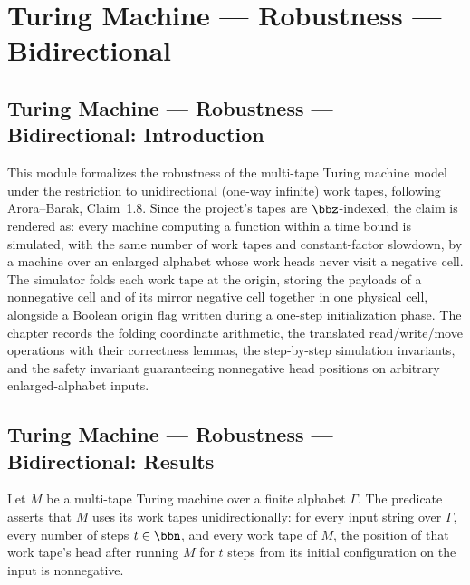 \section{Turing Machine --- Robustness --- Bidirectional}
\subsection*{Turing Machine --- Robustness --- Bidirectional: Introduction}

This module formalizes the robustness of the multi-tape Turing machine model under
the restriction to unidirectional (one-way infinite) work tapes, following
Arora--Barak, Claim~1.8.  Since the project's tapes are $\bbz$-indexed, the claim is
rendered as: every machine computing a function within a time bound is simulated,
with the same number of work tapes and constant-factor slowdown, by a machine over an
enlarged alphabet whose work heads never visit a negative cell.  The simulator folds
each work tape at the origin, storing the payloads of a nonnegative cell and of its
mirror negative cell together in one physical cell, alongside a Boolean origin flag
written during a one-step initialization phase.  The chapter records the folding
coordinate arithmetic, the translated read/write/move operations with their
correctness lemmas, the step-by-step simulation invariants, and the safety invariant
guaranteeing nonnegative head positions on arbitrary enlarged-alphabet inputs.

\subsection*{Turing Machine --- Robustness --- Bidirectional: Results}

\begin{definition}
\label{Turing.FinTM.NonnegativeHeads}
\leanok
{}
Let $M$ be a multi-tape Turing machine over a finite alphabet $\Gamma$.  The
predicate asserts that $M$ uses its work tapes unidirectionally: for every input
string over $\Gamma$, every number of steps $t \in \bbn$, and every work tape of $M$,
the position of that work tape's head after running $M$ for $t$ steps from its
initial configuration on the input is nonnegative.
\end{definition}


